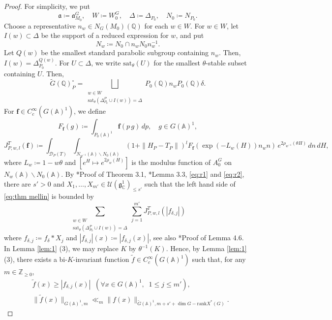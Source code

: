 \documentclass[12pt]{amsart}
\theoremstyle{definition}
\theoremstyle{plain}
\theoremstyle{remark}
\def\C{\mathbb{C}}%
\def\Q{\mathbb{Q}}%
\def\Z{\mathbb{Z}}%
\def\A{\mathbb{A}}%
\def\inf{\infty}
\def\bs{\backslash}%
\newcommand{\fa}{\mathfrak{a}}
\newcommand{\fg}{\mathfrak{g}}
\newcommand{\cD}{\mathcal{D}}
\newcommand{\cU}{\mathcal{U}}
\numberwithin{equation}{section}
\newcommand{\tG}{\widetilde{G}}
\newcommand{\tf}{\tilde{f}}
\newcommand{\sat}{\mathrm{sat}}
\begin{document}
\begin{proof}
For simplicity, we put
\[
\fa\coloneqq \fa_{M_0}^{G},\quad W\coloneqq W_0^G
,\quad \Delta\coloneqq \Delta_{P_0}, \quad N_0\coloneqq N_{P_0}.
\]
Choose a representative $n_w\in N_G(M_0)(\Q)$ for each $w\in W$. 
For $w\in W$, let $I(w)\subset\Delta$ be the support of a reduced expression for $w$, and put
\[
N_w\coloneqq N_0\cap n_wN_0n_w^{-1}.
\]
Let $Q(w)$ be the smallest standard parabolic subgroup containing $n_w$. Then, $I(w)=\Delta_{P_0}^{Q(w)}$.
For $U\subset \Delta$, we write $\sat_\theta(U)$ for the smallest $\theta$-stable subset containing $U$. 
Then, 
\begin{equation}\label{eq:r2}
\tG(\Q)_P^\circ=\bigsqcup_{\substack{w\in W \\ \sat_\theta(\Delta_{P_0}^P\cup I(w))=\Delta }} P_0(\Q) n_w P_0(\Q) \delta.
\end{equation}
For $\mathbf{f}\in C_c^\inf(G(\A)^1)$, we define
\[
F_{\mathbf{f}}(g)\coloneqq \int_{P_0(\A)^1}\mathbf{f}(p\, g)\, dp, \quad g\in G(\A)^1,
\]
\begin{equation*}
J_{P,w,l}^{T}(\mathbf{f})\coloneqq \int_{\cD_P(T)}\int_{N_{w^{-1}}(\A)\backslash N_0(\A)}
(1+\|H_P-T_P\|)^l  F_{\mathbf{f}}( \exp(-L_w(H)) n_wn) \, e^{2\rho_{w^{-1}}(\theta H)}\, dn \,dH, 
\end{equation*}
where $L_w\coloneqq 1-w\theta$ and $[e^H\mapsto e^{2\rho_w(H)}]$ is the modulus function of $A_0^G$ on $N_w(\A)\bs N_0(\A)$.
By \cite{FL16}*{Proof of Theorem 3.1}, \cite{FL16}*{Lemma 3.3}, \eqref{eq:r1} and \eqref{eq:r2}, there are $s'>0$ and $X_1,\dots,X_{m'}\in \cU(\fg^1_\C)_{\le s'}$ such that the left hand side of \eqref{eq:thm mellin} is bounded by
\begin{equation*}
\sum_{\substack{w\in W \\ \sat_\theta(\Delta_{P_0}^P\cup I(w))=\Delta }} \sum_{j=1}^{m'} J_{P,w,l}^{T}(|f_{\delta,j}|)    
\end{equation*}
where $f_{\delta,j}\coloneqq f_\delta*X_j$ and $|f_{\delta,j}|(x)\coloneqq |f_{\delta,j}(x)|$, see also \cite{FM21}*{Proof of Lemma 4.6}. 
In Lemma \ref{lem:1} (3), we may replace $K$ by $\theta^{-1}(K)$.
Hence, by Lemma \ref{lem:1} (3), there exists a bi-$K$-invariant function $\tf\in C_c^\inf(G(\A)^1)$ such that, for any $m\in\Z_{\ge 0}$,
\begin{align*}
& \tf(x)\ge|f_{\delta,j}(x)| \;\; (\forall x\in G(\A)^1,\;\; 1\le j\le m'), \\
&  \|\tf(x)\|_{G(\A)^1,m} \ll_m  \|f(x)\|_{\tG(\A)^1,m+s'+\dim G-\mathrm{rank}X^*(G)}   .  

\end{align*}
\end{proof}
\end{document}
